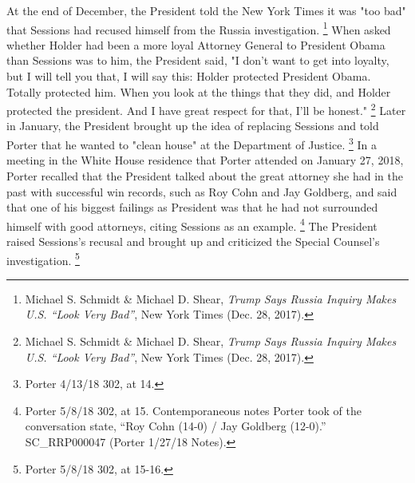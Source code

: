 At the end of December, the President told the New York Times it was "too bad" that Sessions had recused himself from the Russia investigation.%
\footnote{Michael S. Schmidt \& Michael D. Shear, \textit{Trump Says Russia Inquiry Makes U.S. ``Look Very Bad''}, New York Times (Dec. 28, 2017).}
When asked whether Holder had been a more loyal Attorney General to President Obama than Sessions was to him, the President said, "I don't want to get into loyalty, but I will tell you that, I will say this: Holder protected President Obama.
Totally protected him.
When you look at the things that they did, and Holder protected the president.
And I have great respect for that, I'll be honest."%
\footnote{Michael S. Schmidt \& Michael D. Shear, \textit{Trump Says Russia Inquiry Makes U.S. ``Look Very Bad''}, New York Times (Dec. 28, 2017).}
Later in January, the President brought up the idea of replacing Sessions and told Porter that he wanted to "clean house" at the Department of Justice.%
\footnote{Porter 4/13/18 302, at 14.}
In a meeting in the White House residence that Porter attended on January 27, 2018, Porter recalled that the President talked about the great attorney she had in the past with successful win records, such as Roy Cohn and Jay Goldberg, and said that one of his biggest failings as President was that he had not surrounded himself with good attorneys, citing Sessions as an example.%
\footnote{Porter 5/8/18 302, at 15.
Contemporaneous notes Porter took of the conversation state, “Roy Cohn (14-0) / Jay Goldberg (12-0).”
SC\_RRP000047 (Porter 1/27/18 Notes).}
The President raised Sessions's recusal and brought up and criticized the Special Counsel's investigation.%
\footnote{Porter 5/8/18 302, at 15-16.}

